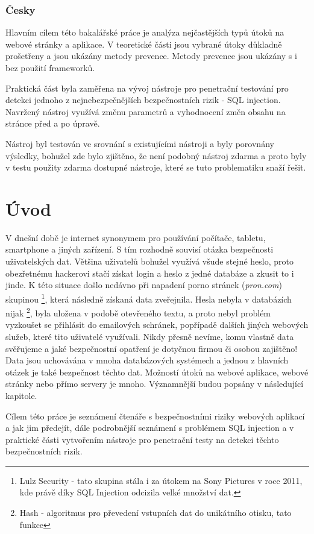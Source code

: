 \documentclass[12pt, a4paper]{report}
\begin{document}
\subsection*{Česky}
Hlavním cílem této bakalářské práce je analýza nejčastějších typů útoků na webové stránky a aplikace. V teoretické části jsou vybrané útoky důkladně prošetřeny a jsou ukázány metody prevence. Metody prevence jsou ukázány s i bez použití frameworků.

Praktická část byla zaměřena na vývoj nástroje pro penetrační testování pro detekci jednoho z nejnebezpečnějších bezpečnostních rizik - SQL injection. Navržený nástroj využívá změnu parametrů a vyhodnocení změn obsahu na stránce před a po úpravě.

Nástroj byl testován ve srovnání s existujícími nástroji a byly porovnány výsledky, bohužel zde bylo zjištěno, že není podobný nástroj zdarma a proto byly v testu použity zdarma dostupné nástroje, které se tuto problematiku snaží řešit.


\chapter{Úvod}
V dnešní době je internet synonymem pro používání počítače, tabletu, smartphone a jiných zařízení. S tím rozhodně souvisí otázka bezpečnosti uživatelských dat. Většina uživatelů bohužel využívá všude stejné heslo, proto obezřetnému hackerovi stačí získat login a heslo z jedné databáze a zkusit to i jinde. K této situace došlo nedávno při napadení porno stránek (\textit{pron.com}) skupinou \footnote{Lulz Security - tato skupina stála i za útokem na Sony Pictures v roce 2011, kde právě díky SQL Injection odcizila velké množství dat.}, která následně získaná data zveřejnila. Hesla nebyla v databázích nijak \footnote{Hash - algoritmus pro převedení vstupních dat do unikátního otisku, tato funkce }, byla uložena v podobě otevřeného textu, a proto nebyl problém vyzkoušet se přihlásit do emailových schránek, popřípadě dalších jiných webových služeb, které tito uživatelé využívali. Nikdy přesně nevíme, komu vlastně data svěřujeme a jaké bezpečnostní opatření je dotyčnou firmou či osobou zajištěno! Data jsou uchovávána v mnoha databázových systémech a jednou z hlavních otázek je také bezpečnost těchto dat. Možností útoků na webové aplikace, webové stránky nebo přímo servery je mnoho. Významnější budou popsány v následující kapitole.

Cílem této práce je seznámení čtenáře s bezpečnostními riziky webových aplikací a jak jim předejít, dále podrobnější seznámení s problémem SQL injection a v praktické části vytvořením nástroje pro penetrační testy na detekci těchto bezpečnostních rizik.
\end{document}
